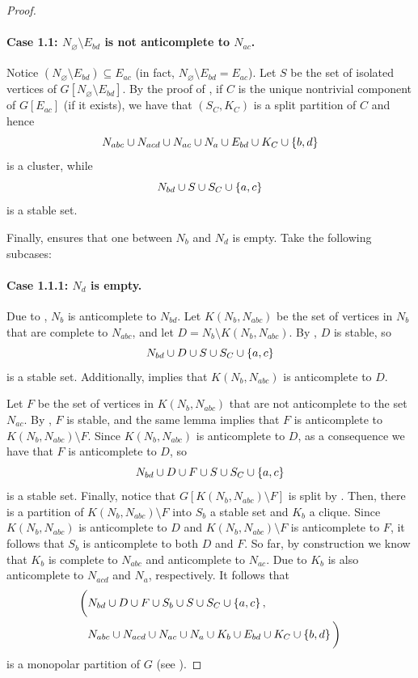 \begin{proof}
    \paragraph{Case 1.1: $N_\varnothing\setminus E_{bd}$ is not anticomplete to
    $N_{ac}$.} Notice $(N_\varnothing \setminus E_{bd}) \subseteq E_{ac}$ (in
    fact, $N_\varnothing \setminus E_{bd} = E_{ac}$).  Let $S$ be the set of
    isolated vertices of $G[N_\varnothing\setminus E_{bd}]$.  By the proof of
    , if $C$ is the unique nontrivial component of
    $G[E_{ac}]$ (if it exists), we have that $(S_C,K_C)$ is a split partition
    of $C$ and hence
    \[
        N_{abc} \cup N_{acd} \cup N_{ac} \cup N_{a} 
        \cup E_{bd} \cup K_C \cup \left\{b,d\right\}
    \]
    is a cluster, while
    \[
        N_{bd} \cup S \cup S_C \cup \left\{a,c\right\}
    \]
    is a stable set.
    
    Finally,  ensures that one between $N_{b}$ and $N_{d}$ is
    empty. Take the following subcases:

    \paragraph{Case 1.1.1: $N_d$ is empty.} Due to , $N_b$ is
    anticomplete to $N_{bd}$. Let $K(N_b,N_{abc})$ be the set of vertices in
    $N_b$ that are complete to $N_{abc}$, and let $D = N_b \setminus
    K(N_b,N_{abc})$. By , $D$ is stable, so
    \[
        N_{bd} \cup D \cup S \cup S_C \cup \left\{a,c\right\}
    \]
    is a stable set. Additionally,  implies that
    $K(N_b,N_{abc})$ is anticomplete to $D$.
    
    Let $F$ be the set of vertices in $K(N_b,N_{abc})$ that are not anticomplete
    to the set $N_{ac}$. By , $F$ is stable, and the same
    lemma implies that $F$ is anticomplete to $K(N_b,N_{abc})\setminus F$. Since
    $K(N_b,N_{abc})$ is anticomplete to $D$, as a consequence we have that $F$
    is anticomplete to $D$, so
    \[
        N_{bd} \cup D \cup F \cup S \cup S_C \cup \left\{a,c\right\}
    \]
    is a stable set. Finally, notice that $G[K(N_b,N_{abc})\setminus F]$ is
    split by . Then, there is a partition of
    $K(N_b,N_{abc})\setminus F$ into $S_b$ a stable set and $K_b$ a clique.
    Since $K(N_b,N_{abc})$ is anticomplete to $D$ and $K(N_b,N_{abc})\setminus
    F$ is anticomplete to $F$, it follows that $S_b$ is anticomplete to both $D$
    and $F$. So far, by construction we know that $K_b$ is complete to $N_{abc}$
    and anticomplete to $N_{ac}$.   Due to  $K_b$ is
    also anticomplete to $N_{acd}$ and $N_a$, respectively. It follows that
    \begin{align*}
        \bigg( 
            & N_{bd} \cup D \cup F \cup S_b \cup S \cup S_C \cup \left\{a,c\right\} , \\
            & N_{abc} \cup N_{acd} \cup N_{ac} \cup N_{a} \cup K_b \cup E_{bd} 
            \cup K_C \cup \left\{b,d\right\} \bigg)
    \end{align*}
    is a monopolar partition of $G$ (see
    ).


\end{proof}
